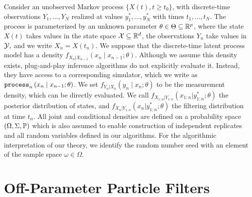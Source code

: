 Consider an unobserved Markov process $\{X(t),t  \geq t_0\}$, with discrete-time observations $Y_1,...,Y_N$ realized at values $y_1^*,\dots,y_N^*$ with times $t_1,\dots, t_N$.
The process is parameterized by an unknown parameter $\theta \in \Theta \subseteq {\mathbb{R}}^p$, where the state $X(t)$ takes values in the state space ${\mathcal{X}} \subseteq {\mathbb{R}}^d$, the observations $Y_n$ take values in ${\mathcal{Y}},$ and we write $X_n = X(t_n)$. We suppose that the discrete-time latent process model has a density $f_{X_n|X_{n-1}}\left(x_{n} \mid x_{n-1}; \theta\right)$.
Although we assume this density exists, plug-and-play inference algorithms do not explicitly evaluate it.
Instead, they have access to a corresponding simulator, which we write as $\process_n\left(x_n\mid x_{n-1}; \theta\right)$.
We set $f_{Y_n|X_n}\left(y_n \mid x_n; \theta\right)$ to be the measurement density, which can be directly evaluated. 
We call $f_{X_{1:n}|Y_{1:n}}(x_{1:n}|y_{1:n}^*; \theta)$ the posterior distribution of states, and $f_{X_{n}|Y_{1:n}}(x_n|y_{1:n}^*; \theta)$ the filtering distribution at time $t_n$.
All joint and conditional densities are defined on a probability space $(\Omega, \Sigma, {\mathbb{P}})$ which is also assumed to enable construction of independent replicates and all random variables defined in our algorithms.
For the algorithmic interpretation of our theory, we identify the random number seed with an element of the sample space $\omega \in \Omega$.

\section{Off-Parameter Particle Filters}

